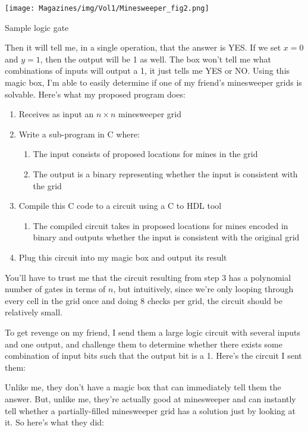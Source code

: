 \documentclass{article}
\begin{document}
\begin{multicols}{3}
{\begin{center}
    \texttt{[image: Magazines/img/Vol1/Minesweeper\_fig2.png]}
    
    \small{Sample logic gate}
\end{center}

Then it will tell me, in a single operation, that the answer is YES. If we set $x=0$ and $y=1$, then the output will be 1 as well. The box won’t tell me what combinations of inputs will output a 1, it just tells me YES or NO. Using this magic box, I’m able to easily determine if one of my friend’s minesweeper grids is solvable. Here’s what my proposed program does:
\begin{enumerate}
\item Receives as input an $n \times n$ minesweeper grid
\item Write a sub-program in C where:
    \begin{enumerate}
    \item The input consists of proposed locations for mines in the grid
    \item The output is a binary representing whether the input is consistent with the grid
    \end{enumerate}
\item Compile this C code to a circuit using a C to HDL tool
\begin{enumerate}
    \item The compiled circuit takes in proposed locations for mines encoded in binary and outputs whether the input is consistent with the original grid
\end{enumerate}
\item Plug this circuit into my magic box and output its result
\end{enumerate}

You’ll have to trust me that the circuit resulting from step 3 has a polynomial number of gates in terms of $n$, but intuitively, since we’re only looping through every cell in the grid once and doing 8 checks per grid, the circuit should be relatively small.



To get revenge on my friend, I send them a large logic circuit with several inputs and one output, and challenge them to determine whether there exists some combination of input bits such that the output bit is a 1. Here’s the circuit I sent them:

Unlike me, they don’t have a magic box that can immediately tell them the answer. But, unlike me, they’re actually good at minesweeper and can instantly tell whether a partially-filled minesweeper grid has a solution just by looking at it. So here’s what they did:

}
\end{multicols}
\end{document}

